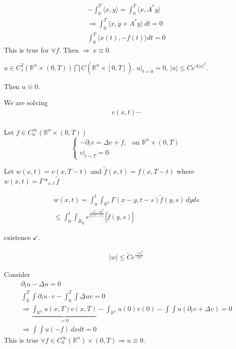 \documentclass[11pt]{article}
\begin{document}
\begin{align*}
    -\int_{0}^{T}\langle x,\dot{y} \rangle = \int_{0}^{T}\langle x, A^{*}y \rangle\\
    \Longrightarrow \int_{0}^{T}\langle x, \dot{y} + A^{*}y \rangle \,dt = 0 \\
    \int_{0}^{T}\langle x(t), -f(t) \rangle dt = 0
\end{align*}
This is true for $\forall  f$.
Then $\Longrightarrow \, x \equiv 0$.

\begin{theorem}
    $u \in C_{1}^{2}(\mathbb{R}^{n} \times (0,T)) \bigcap C(\overline{\mathbb{R}^{n} \times [0,T]})$.
    $u|_{t=0} = 0$, $|u| \le Ce^{A|x|^{2}}$.

    Then $u \equiv 0$.
\end{theorem}

We are solving 
\begin{align*}
    v(x,t)\cdots\\
\end{align*}

Let $f \in C_{0}^{\infty}(\mathbb{R}^{n} \times (0,T))$
\begin{equation}
    \begin{cases} 
        -\partial_{t}v = \Delta v + f, & \text{on }\mathbb{R}^{n} \times (0,T)  \\ 
    v|_{t=T} = 0  
    \end{cases}
\end{equation}

Let $w(x,t) = v(x,T-t)$ and $\tilde{f}(x,t) = f(x,T-t)$ where $w(x,t) = \Gamma *_{x,t} \tilde{f}$

\begin{align*}
    w(x,t ) = \int_{0}^{t}\int_{\mathbb{R}^{n}}\Gamma(x-y, t-s) \tilde{f}(y,s) \,dyds \\
    \le \int_{0}^{t}\int_{B_{R}}e^{\frac{-|x-y|^{2}}{4(t-s)}}|\tilde{f}(y,s)|
\end{align*}

existence $\checkmark$.

\begin{align*}
    |w| \le \tilde{C}e^{\frac{-|x|^{2}}{Ct}}
\end{align*}

Consider 
\begin{align*}
    \partial_{t}u - \Delta u = 0\\
    \int_{0}^{T}\int \partial_{t} u \cdot v - \int_{0}^{T}\int \Delta u v = 0\\
    \Longrightarrow \underbrace{\int_{\mathbb{R}^{n}}u(x,T)v(x,T)}_{= 0} - \int_{\mathbb{R}^{n}}
        u(0)v(0) - \int \int u(\partial_{t}v + \Delta v) = 0\\
    \Longrightarrow \int \int u(-f)\,dx dt = 0
\end{align*}
This is true $\forall f \in C_{0}^{\infty}(\mathbb{R}^{n})\times (0,T) \Longrightarrow u \equiv 0$.
\end{document}
